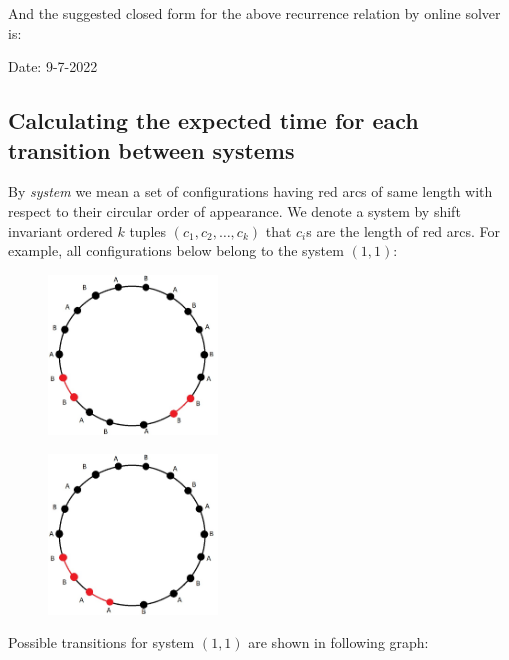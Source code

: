 \documentclass[]{book}
\theoremstyle{definition}
\begin{document}
And the suggested closed form for the above recurrence relation by online solver is:
\newpage
\begin{center}
Date: 9-7-2022
\end{center}


\subsection{Calculating the expected time for each transition between systems}
By \emph{system} we mean a set of configurations having red arcs of same length with respect to their circular order of appearance. We denote a system by shift invariant ordered $k$ tuples $\left( c_1, c_2, \hdots, c_k\right)$ that $c_i$s are the length of red arcs. For example, all configurations below belong to the system $\left( 1, 1 \right)$:
\begin{figure}[H]
    \centering
    \includegraphics[width=0.4\textwidth]{figures/s1.jpg}
    \caption{}
\end{figure}
\begin{figure}[H]
    \centering
    \includegraphics[width=0.4\textwidth]{figures/s2.jpg}
    \caption{}
\end{figure}
Possible transitions for system $\left( 1, 1 \right)$ are shown in following graph:
\end{document}
